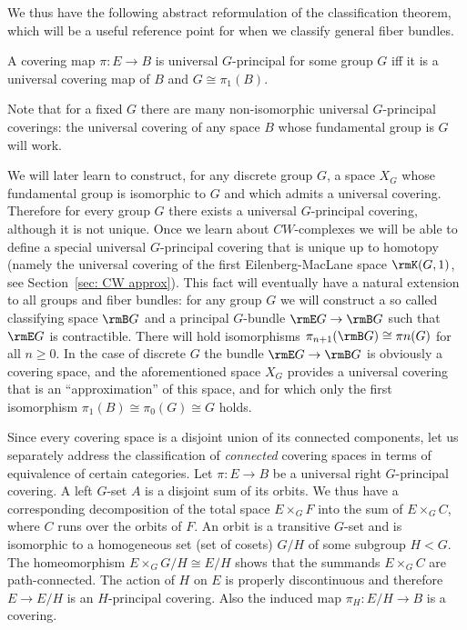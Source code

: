 We thus have the following abstract reformulation of the classification theorem, which will be a useful reference point for when we classify general fiber bundles.

\begin{thm}
    A covering map $\pi:E\to B$ is universal $G$-principal for some group $G$ iff it is a universal covering map of $B$ and $G\cong \pi_1(B)$.
\end{thm}
Note that for a fixed $G$ there are many non-isomorphic universal $G$-principal coverings: the universal covering of any space $B$ whose fundamental group is $G$ will work. 

\begin{rem}\label{rem: classifying space for discrete G}
    We will later learn to construct, for any discrete group $G$, a space $X_G$ whose fundamental group is isomorphic to $G$ and which admits a universal covering. Therefore for every group $G$ there exists a universal $G$-principal covering, although it is not unique. Once we learn about $CW$-complexes we will be able to define a special universal $G$-principal covering that is unique up to homotopy (namely the universal covering of the first Eilenberg-MacLane space $\rmK(G,1)$, see Section~\ref{sec: CW approx}). This fact will eventually have a natural extension to all groups and fiber bundles: for any group $G$ we will construct a so called classifying space $\rmB G$ and a principal $G$-bundle $\rmE G\to \rmB G$ such that $\rmE G$ is contractible. There will hold isomorphisms $\pi_{n+1}(\rmB G)\cong \pi{n}(G)$ for all $n\geq 0$. In the case of discrete $G$ the bundle $\rmE G\to \rmB G$ is obviously a covering space, and the aforementioned space $X_G$ provides a universal covering that is an ``approximation'' of this space, and for which only the first isomorphism $\pi_1(B)\cong \pi_0(G)\cong G$ holds.
\end{rem}

Since every covering space is a disjoint union of its connected components, let us separately address the classification of \emph{connected} covering spaces in terms of equivalence of certain categories. Let $\pi:E\to B$ be a universal right $G$-principal covering. A left $G$-set $A$ is a disjoint sum of its orbits. We thus have a corresponding decomposition of the total space $E\times_G F$ into the sum of $E\times_G C$, where $C$ runs over the orbits of $F$. An orbit is a transitive $G$-set and is isomorphic to a homogeneous set (set of cosets) $G\slash H$ of some subgroup $H<G$. The homeomorphism $E\times_G G\slash H\cong E\slash H$ shows that the summands $E\times_G C$ are path-connected. The action of $H$ on $E$ is properly discontinuous and therefore $E\to E\slash H$ is an $H$-principal covering. Also the induced map $\pi_H:E\slash H\to B$ is a covering.

